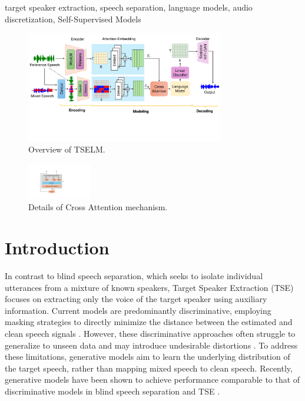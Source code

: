 \documentclass[conference]{IEEEtran}
\begin{document}
\begin{IEEEkeywords}
target speaker extraction, speech separation, language models, audio discretization, Self-Supervised Models
\end{IEEEkeywords}
\begin{figure}[t]
    \centering
    \includegraphics[width=0.77\textwidth]{assets/model.pdf}
    \caption{Overview of TSELM.}
    \label{model}
    \vspace{-12pt}
    \end{figure}

    \begin{figure}
        \centering
        \includegraphics[width=0.25\textwidth]{assets/cross_attention.pdf}
        \caption{Details of Cross Attention mechanism.}
        \label{cross_attention}
        \vspace{-17pt}
        \end{figure}


        
\section{Introduction}

In contrast to blind speech separation, which seeks to isolate individual utterances from a mixture of known speakers, Target Speaker Extraction (TSE) focuses on extracting only the voice of the target speaker using auxiliary information. Current models are predominantly discriminative, employing masking strategies to directly minimize the distance between the estimated and clean speech signals \cite{luo2019conv,spex_plus,sepformer,sef_net}. However, these discriminative approaches often struggle to generalize to unseen data and may introduce undesirable distortions \cite{distortion}. To address these limitations, generative models aim to learn the underlying distribution of the target speech, rather than mapping mixed speech to clean speech. Recently, generative models have been shown to achieve performance comparable to that of discriminative models in blind speech separation \cite{tokensplit} and TSE \cite{target_diff}.
\end{document}
